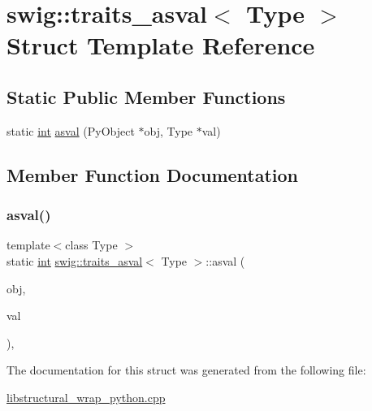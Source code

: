 \hypertarget{structswig_1_1traits__asval}{}\section{swig\+:\+:traits\+\_\+asval$<$ Type $>$ Struct Template Reference}
\label{structswig_1_1traits__asval}
\subsection*{Static Public Member Functions}
\begin{DoxyCompactItemize}
\item 
static \hyperlink{lp__lib_8h_adeb9ec6400320e4923ac9d836d509ddb}{int} \hyperlink{structswig_1_1traits__asval_a5d0ee3dd0c23458db2aeae93d8c02bc0}{asval} (Py\+Object $\ast$obj, Type $\ast$val)
\end{DoxyCompactItemize}


\subsection{Member Function Documentation}
\mbox{\label{structswig_1_1traits__asval_a5d0ee3dd0c23458db2aeae93d8c02bc0}} 
\subsubsection{\texorpdfstring{asval()}{asval()}}
{\footnotesize\ttfamily template$<$class Type $>$ \\
static \hyperlink{lp__lib_8h_adeb9ec6400320e4923ac9d836d509ddb}{int} \hyperlink{structswig_1_1traits__asval}{swig\+::traits\+\_\+asval}$<$ Type $>$\+::asval (\begin{DoxyParamCaption}\item[{Py\+Object $\ast$}]{obj,  }\item[{Type $\ast$}]{val }\end{DoxyParamCaption})\hspace{0.3cm}{\ttfamily [inline]}, {\ttfamily [static]}}



The documentation for this struct was generated from the following file\+:\begin{DoxyCompactItemize}
\item 
\hyperlink{libstructural__wrap__python_8cpp}{libstructural\+\_\+wrap\+\_\+python.\+cpp}\end{DoxyCompactItemize}
